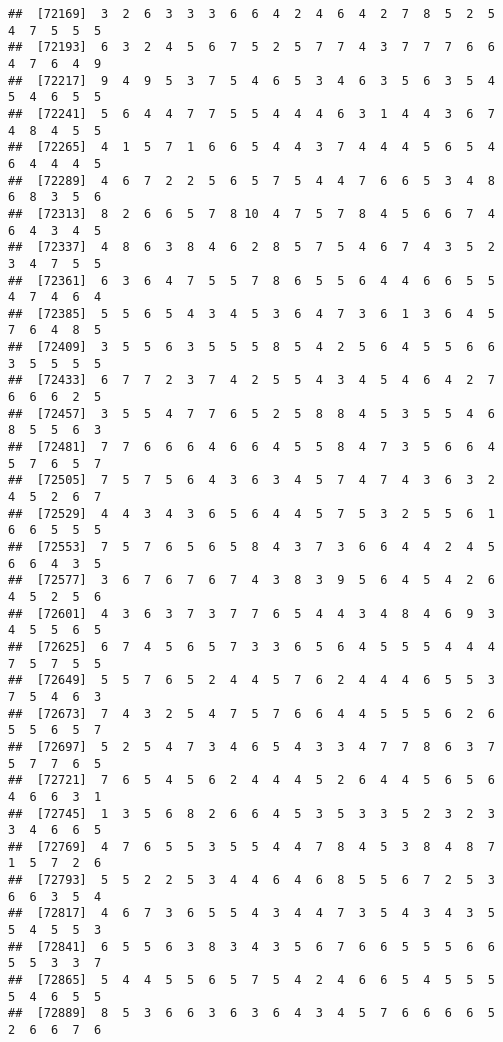 \documentclass[
]{book}
\begin{document}
\begin{verbatim}
##  [72169]  3  2  6  3  3  3  6  6  4  2  4  6  4  2  7  8  5  2  5  4  7  5  5  5
##  [72193]  6  3  2  4  5  6  7  5  2  5  7  7  4  3  7  7  7  6  6  4  7  6  4  9
##  [72217]  9  4  9  5  3  7  5  4  6  5  3  4  6  3  5  6  3  5  4  5  4  6  5  5
##  [72241]  5  6  4  4  7  7  5  5  4  4  4  6  3  1  4  4  3  6  7  4  8  4  5  5
##  [72265]  4  1  5  7  1  6  6  5  4  4  3  7  4  4  4  5  6  5  4  6  4  4  4  5
##  [72289]  4  6  7  2  2  5  6  5  7  5  4  4  7  6  6  5  3  4  8  6  8  3  5  6
##  [72313]  8  2  6  6  5  7  8 10  4  7  5  7  8  4  5  6  6  7  4  6  4  3  4  5
##  [72337]  4  8  6  3  8  4  6  2  8  5  7  5  4  6  7  4  3  5  2  3  4  7  5  5
##  [72361]  6  3  6  4  7  5  5  7  8  6  5  5  6  4  4  6  6  5  5  4  7  4  6  4
##  [72385]  5  5  6  5  4  3  4  5  3  6  4  7  3  6  1  3  6  4  5  7  6  4  8  5
##  [72409]  3  5  5  6  3  5  5  5  8  5  4  2  5  6  4  5  5  6  6  3  5  5  5  5
##  [72433]  6  7  7  2  3  7  4  2  5  5  4  3  4  5  4  6  4  2  7  6  6  6  2  5
##  [72457]  3  5  5  4  7  7  6  5  2  5  8  8  4  5  3  5  5  4  6  8  5  5  6  3
##  [72481]  7  7  6  6  6  4  6  6  4  5  5  8  4  7  3  5  6  6  4  5  7  6  5  7
##  [72505]  7  5  7  5  6  4  3  6  3  4  5  7  4  7  4  3  6  3  2  4  5  2  6  7
##  [72529]  4  4  3  4  3  6  5  6  4  4  5  7  5  3  2  5  5  6  1  6  6  5  5  5
##  [72553]  7  5  7  6  5  6  5  8  4  3  7  3  6  6  4  4  2  4  5  6  6  4  3  5
##  [72577]  3  6  7  6  7  6  7  4  3  8  3  9  5  6  4  5  4  2  6  4  5  2  5  6
##  [72601]  4  3  6  3  7  3  7  7  6  5  4  4  3  4  8  4  6  9  3  4  5  5  6  5
##  [72625]  6  7  4  5  6  5  7  3  3  6  5  6  4  5  5  5  4  4  4  7  5  7  5  5
##  [72649]  5  5  7  6  5  2  4  4  5  7  6  2  4  4  4  6  5  5  3  7  5  4  6  3
##  [72673]  7  4  3  2  5  4  7  5  7  6  6  4  4  5  5  5  6  2  6  5  5  6  5  7
##  [72697]  5  2  5  4  7  3  4  6  5  4  3  3  4  7  7  8  6  3  7  5  7  7  6  5
##  [72721]  7  6  5  4  5  6  2  4  4  4  5  2  6  4  4  5  6  5  6  4  6  6  3  1
##  [72745]  1  3  5  6  8  2  6  6  4  5  3  5  3  3  5  2  3  2  3  3  4  6  6  5
##  [72769]  4  7  6  5  5  3  5  5  4  4  7  8  4  5  3  8  4  8  7  1  5  7  2  6
##  [72793]  5  5  2  2  5  3  4  4  6  4  6  8  5  5  6  7  2  5  3  6  6  3  5  4
##  [72817]  4  6  7  3  6  5  5  4  3  4  4  7  3  5  4  3  4  3  5  5  4  5  5  3
##  [72841]  6  5  5  6  3  8  3  4  3  5  6  7  6  6  5  5  5  6  6  5  5  3  3  7
##  [72865]  5  4  4  5  5  6  5  7  5  4  2  4  6  6  5  4  5  5  5  5  4  6  5  5
##  [72889]  8  5  3  6  6  3  6  3  6  4  3  4  5  7  6  6  6  6  5  2  6  6  7  6

\end{verbatim}
\end{document}
